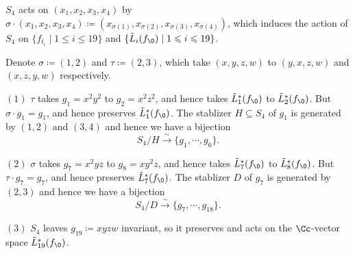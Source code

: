 $S_4$ acts on $(x_1,x_2, x_3, x_4)$ by $\sigma \cdot (x_1,x_2, x_3, x_4) \coloneq  (x_{\sigma(1)}, x_{\sigma(2)}, x_{\sigma(3)}, x_{\sigma(4)})$, which induces the action of $S_4$ on $\{f_{t_i}\mid 1\leqslant i \leqslant 19\}$ and $\{ \tilde L_i(f_\0) \mid 1\leqslant i \leqslant 19\}$.
\begin{example} Denote $\sigma\coloneq (1,2)$ and $\tau\coloneq (2,3)$, which take  $(x,y,z,w)$ to $(y,x,z, w)$ and $(x,z,y,w)$ respectively.
\item[$(1)$] $\tau$ takes $g_1=x^2y^2$ to $g_2=x^2 z^2$, and hence takes $\tilde L^*_1(f_\0)$ to $\tilde L^*_2(f_\0)$. But $\sigma\cdot g_1= g_1$, and hence preserves $\tilde L^*_1(f_\0)$. The stablizer $H\subseteq S_4$ of $g_1$ is  generated by $(1,2)$ and $(3,4)$ and hence we have a bijection
  \[S_4/H \stackrel \sim \to \{ g_1,\cdots, g_6\}.\]
\item[$(2)$] $\sigma$ takes $g_7=x^2yz$ to $g_8= xy^2z$, and hence takes $\tilde L^*_7(f_\0)$ to $\tilde L^*_8(f_\0)$. But $\tau\cdot g_7=g_7$, and hence preserves $\tilde L^*_7(f_\0)$. The stablizer $D$ of $g_7$ is generated by $(2,3)$ and hence we have a bijection
  \[S_4/D \stackrel \sim \to \{ g_7,\cdots, g_{18}\}.\]
\item[$(3)$] $S_4$ leaves $g_{19}\coloneq xyzw$ invariant, so it preserves and acts on the $\Cc$-vector space $\tilde L^*_{19}(f_\0)$.
\end{example}


